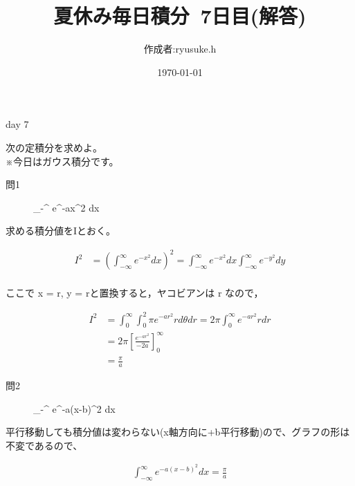 \documentclass[12pt,a4paper]{jsarticle}
\title{夏休み毎日積分~7日目(解答)}
\date{\today}
\begin{document}
\maketitle

\begin{flushright}
    \author{作成者:ryusuke.h}
\end{flushright}

\begin{itembox}{day 7 }
    \begin{center}
        次の定積分を求めよ。\\
        ※今日はガウス積分です。
    \end{center}
\end{itembox}

\begin{description}
    \item [問1] {\displaystyle} \int_{-\infty}^{\infty} e^{-ax^2} dx \\
\end{description}

求める積分値をIとおく。

\begin{align*}
    I^2 &= \left(\int_{-\infty}^{\infty} e^{-x^2} dx\right)^2 
    =  \int_{-\infty}^{\infty} e^{-x^2} dx \int_{-\infty}^{\infty} e^{-y^2} dy\\
\end{align*}

ここで x = r\cos\theta , y = r\sin\theta と置換すると，ヤコビアンは r なので，

\begin{align*}
    I^2 &= \int_0^{\infty} \int_0^2{\pi} e^{-ar^2} r d{\theta}dr 
    = 2{\pi} \int_0^{\infty} e^{-ar^2} r dr \\
    &= 2{\pi} \left[\frac{e^{-ar^2}}{-2a}\right]_0^{\infty} \\
    &= \frac{\pi}{a}
\end{align*}

\begin{description}
    \item [問2] {\displaystyle} \int_{-\infty}^{\infty} e^{-a(x-b)^2} dx
\end{description}

平行移動しても積分値は変わらない(x軸方向に+b平行移動)ので、グラフの形は不変であるので、

\begin{align*}
    \int_{-\infty}^{\infty} e^{-a(x-b)^2} dx = \frac{\pi}{a}
\end{align*}
\end{document}
